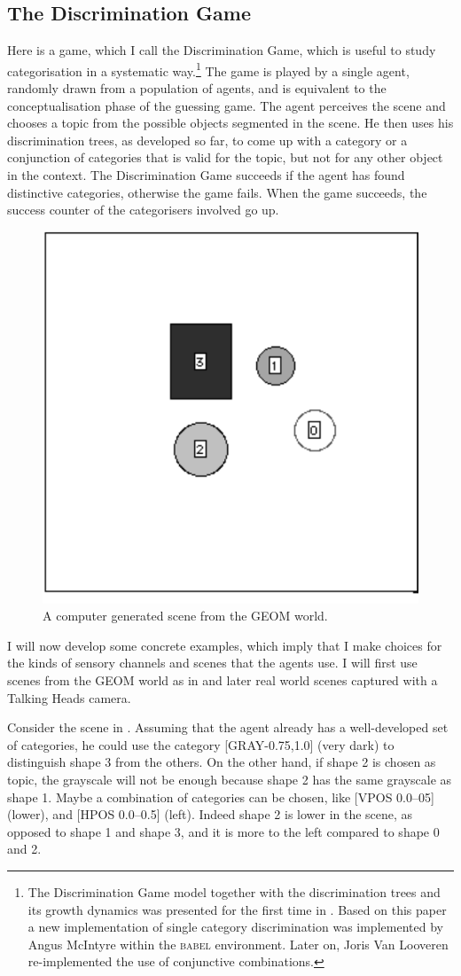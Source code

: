 \subsection{The Discrimination Game} 

Here is a game, which I call the Discrimination Game, which is useful 
to study categorisation in 
a systematic way.\footnote{
The Discrimination Game model together with the 
discrimination trees and its growth dynamics 
was presented for the first time in \cite{Steels:1996}. 
Based on this paper a new implementation of
single category discrimination was implemented by Angus McIntyre 
within the \textsc{babel} environment. Later on, Joris Van Looveren
re-implemented the use of conjunctive combinations.}
The game is played by a single agent, randomly 
drawn from a population of agents, and 
is equivalent to the conceptualisation phase of 
the guessing game. The agent perceives the scene and 
chooses a topic from the possible objects segmented in the
scene. He then uses his discrimination trees, as developed so
far, to come up with a category or a conjunction
of categories that is valid for the topic, but not for any
other object in the context. The Discrimination Game succeeds if 
the agent has found distinctive categories, otherwise the game
fails. When the game succeeds, the success counter
of the categorisers involved go up. 

\begin{figure}[htbp]
  \centerline{\includegraphics[width=.40\textwidth]{chap4/figs/game5.pdf}}
\caption{\label{geom}A computer generated scene 
from the GEOM world.}
\end{figure}

I will now develop some concrete examples, which imply
that I make choices for the kinds of sensory channels
and scenes that the agents use. 
I will first use scenes from the GEOM world as in 
 and later real world scenes captured
with a Talking Heads camera. 

Consider the scene in . Assuming that the agent
already has a well-developed set of categories, he could use 
the category [GRAY-0.75,1.0] (very dark) to distinguish 
shape 3 from the others. On the other hand, if shape 2 is 
chosen as topic, the grayscale will not be enough because
shape 2 has the same grayscale as shape 1. Maybe a 
combination of categories can be chosen, like [VPOS 0.0--05]
(lower), and [HPOS 0.0–0.5] (left). Indeed shape 2
is lower in the scene, as opposed to
shape 1 and shape 3, and it is more to the left compared 
to shape 0 and 2.


